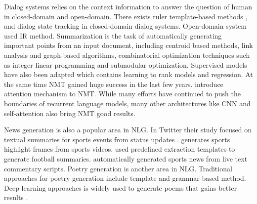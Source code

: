 \documentclass[letterpaper]{article} %
\begin{document}

  Dialog systems relies on the context information to answer the question of human in closed-domain and open-domain. 
  There exists ruler template-based methods \cite{williams2016end,mrkvsic2015multi}, and dialog state tracking\cite{henderson2015machine,wang2013simple} in closed-domain dialog systems. 
  Open-domain system used IR\cite{ji2014information,yan2016docchat} method. 
  Summarization is the task of automatically generating important points from an input document, including centroid based methods, link analysis and graph-based algorithms\cite{erkan2004lexrank,wan2007manifold}, combinatorial optimization techniques such as integer linear programming\cite{gillick2008icsi} and submodular optimization\cite{lin2010multi}. 
  Supervised models have also been adapted which contains learning to rank models\cite{metzler2008machine,shen2011learning,wang2016sentence} and regression\cite{ouyang2007developing,galanis2008aueb}. 
  At the same time NMT gained huge success in the last few years\cite{sutskever2014sequence,wu2016google}. 
  \cite{luong2015effective} introduce attention mechanism to NMT. While many efforts have continued to push the boundaries of recurrent language models\cite{jozefowicz2016exploring}, many other architectures like CNN\cite{gehring2017convolutional} and self-attention\cite{vaswani2017attention} also bring NMT good results.
  
  News generation is also a popular area in NLG. In Twitter their study focused on textual summaries for sports events from status updates \cite{nichols2012summarizing}. \cite{tjondronegoro2004highlights} generates sports highlight frames from sports videos. \cite{bouayad2012perspective}used predefined extraction templates to generate football summaries. \cite{zhang2016towards} automatically generated sports news from live text commentary scripts. Poetry generation is another area in NLG. Traditional approaches for poetry generation include template and grammar-based method\cite{manurung1999chart,oliveira2012poetryme}. Deep learning approaches is widely used to generate poems that gains better results \cite{ghazvininejad2017hafez,hopkins2017automatically}. 
\end{document}
